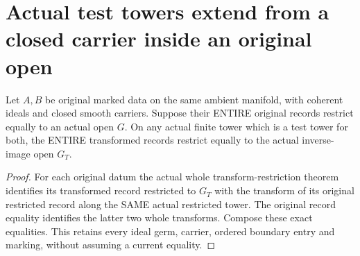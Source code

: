 \section{Actual test towers extend from a closed carrier inside an original open}
\label{sec:open-carrier-test-tower-extension}

\begin{theorem}
\label{hir:original-open-equal-current-test-records}
\leanok
Let $A,B$ be original marked data on the same ambient manifold, with coherent
ideals and closed smooth carriers. Suppose their ENTIRE original records
restrict equally to an actual open $G$. On any actual finite tower which is
a test tower for both, the ENTIRE transformed records restrict equally to
the actual inverse-image open $G_T$.
\end{theorem}
\begin{proof}
For each original datum the actual whole transform-restriction theorem
identifies its transformed record restricted to $G_T$ with the transform
of its original restricted record along the SAME actual restricted tower.
The original record equality identifies the latter two whole transforms.
Compose these exact equalities. This retains every ideal germ, carrier,
ordered boundary entry and marking, without assuming a current equality.
\end{proof}

